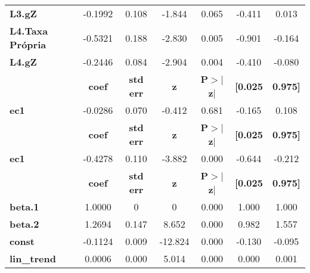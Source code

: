 \begin{center}
\begin{tabular}{lcccccc}
\textbf{L3.gZ}           &      -0.1992  &        0.108     &    -1.844  &         0.065        &       -0.411    &        0.013     \\
\textbf{L4.Taxa Própria} &      -0.5321  &        0.188     &    -2.830  &         0.005        &       -0.901    &       -0.164     \\
\textbf{L4.gZ}           &      -0.2446  &        0.084     &    -2.904  &         0.004        &       -0.410    &       -0.080     \\
             & \textbf{coef} & \textbf{std err} & \textbf{z} & \textbf{P$> |$z$|$} & \textbf{[0.025} & \textbf{0.975]}  \\
\midrule
\textbf{ec1} &      -0.0286  &        0.070     &    -0.412  &         0.681        &       -0.165    &        0.108     \\
             & \textbf{coef} & \textbf{std err} & \textbf{z} & \textbf{P$> |$z$|$} & \textbf{[0.025} & \textbf{0.975]}  \\
\midrule
\textbf{ec1} &      -0.4278  &        0.110     &    -3.882  &         0.000        &       -0.644    &       -0.212     \\
                    & \textbf{coef} & \textbf{std err} & \textbf{z} & \textbf{P$> |$z$|$} & \textbf{[0.025} & \textbf{0.975]}  \\
\midrule
\textbf{beta.1}     &       1.0000  &            0     &         0  &         0.000        &        1.000    &        1.000     \\
\textbf{beta.2}     &       1.2694  &        0.147     &     8.652  &         0.000        &        0.982    &        1.557     \\
\textbf{const}      &      -0.1124  &        0.009     &   -12.824  &         0.000        &       -0.130    &       -0.095     \\
\textbf{lin\_trend} &       0.0006  &        0.000     &     5.014  &         0.000        &        0.000    &        0.001     \\
\bottomrule
\end{tabular}
\end{center}